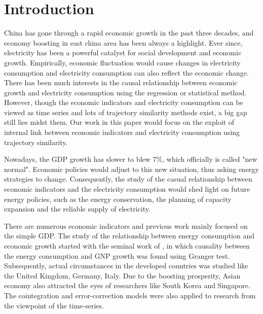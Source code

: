 \documentclass{sig-alternate-05-2015}
\begin{document}
%
%

%
%
\printccsdesc



\section{Introduction}
China has gone through a rapid economic growth in the past three decades, and economy boosting in east china area has been always a highlight. Ever since, electricity has been a powerful catalyst for social development and economic growth. Empirically, economic fluctuation would cause changes in electricity consumption and electricity consumption can also reflect the economic change. There has been much interests in the causal relationship between economic growth and electricity consumption using the regression or statistical method. However, though the economic indicators and electricity consumption can be viewed as time series and lots of trajectory similarity methods exist, a big gap still lies midst them. Our work in this paper would focus on the exploit of internal link between economic indicators and electricity consumption using trajectory similarity.

Nowadays, the GDP growth has slower to blew 7\%, which officially is called "new normal". Economic policies would adjust to this new situation, thus asking energy strategies to change. Consequently, the study of the casual relationship between economic indicators and the electricity consumption would shed light on future energy policies, such as the energy conservation, the planning of capacity expansion and the reliable supply of electricity.
  
There are numerous economic indicators and previous work mainly focused on the simple GDP. The study of the relationship between energy consumption and economic growth started with the seminal work of \cite{kraft:relationship}, in which causality between the energy consumption and GNP growth was found using Granger test. Subsequently, actual circumstances in the developed countries was studied like the United Kingdom, Germany, Italy\cite{yu:causal, erol1987causal}. Due to the boosting prosperity, Asian economy also attracted the eyes of researchers like South Korea and Singapore. The cointegration and error-correction models were also applied to research from the viewpoint of the time-series\cite{glasure1998cointegration}.
\end{document}
